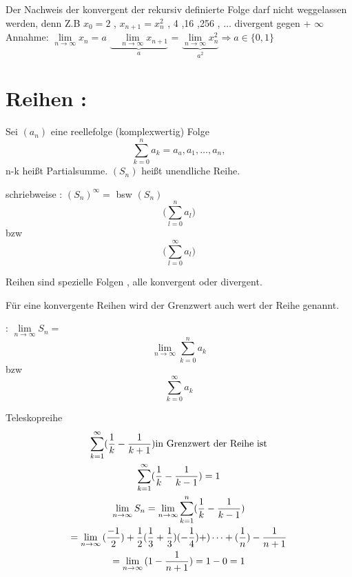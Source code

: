 \begin{remark}
Der Nachweis der konvergent der rekursiv definierte Folge darf nicht weggelassen werden, denn Z.B $x_0=2$ , $x_{n+1}=x_n^2$ \quad \quad {} , 4 ,16 ,256 , $\dots $ divergent gegen + $\infty$  \\

Annahme: $\lim\limits_{n \rightarrow \infty}{x_n}= a $ 
$\underbrace{\quad \lim\limits_{n \rightarrow \infty}{x_{n+1}}}_{a}$ = 
$\underbrace{\lim\limits_{n \rightarrow \infty}{x_n^2}}_{a^2} \Rightarrow a \in \{ 0,1 \}$
\end{remark}  

 
\newpage
\section{Reihen :}
\begin{definition}
Sei $(a_n)$ eine reellefolge (komplexwertig) Folge\\
$$\sum_{k = 0}^{n} {a_k} = a_a , a_1, \dots , a_n , $$
 n-k heißt Partialsumme.
$(S_n)$ heißt unendliche Reihe.

schriebweise : $(S_n)^\infty =$ bsw 
$(S_n)$ $$ \bigg( \sum_{l=0}^{n} {a_l} \bigg)$$ bzw
 $$ \bigg( \sum_{l=0}^{\infty} {a_l} \bigg)$$  
\end{definition}

\begin{remark}
Reihen sind spezielle Folgen , alle konvergent oder divergent. 
\end{remark}

\begin{definition}
Für eine konvergente Reihen wird der Grenzwert auch wert der Reihe genannt.\\

\begin{schreibweise}
 :  $\lim\limits_{n \rightarrow \infty}{S_n}= $
$$\lim\limits_{n \rightarrow \infty}{ \sum_{k=0}^{n} {a_k} }  $$ 
bzw 
$$ \sum_{k=0}^{\infty} {a_k}  $$
\end{schreibweise}

\end{definition}

\begin{example}{Teleskopreihe} 
\begin{gather*}
\sum_{k=1}^\infty(\frac{1}{k}-\frac{1}{k+1}) \text{in Grenzwert der Reihe ist}\\ 
\sum_{k=1}^\infty(\frac{1}{k}-\frac{1}{k-1})=1 \\
\lim_{n \to \infty}{S_n} = \lim_{n \to \infty}{\sum_{k=1}^n(\frac{1}{k}- \frac{1}{k-1}) }\\
= \lim\limits_{n \rightarrow \infty}{(\frac{-1}{2})+\frac{1}{2}(\frac{1}{3} + \frac{1}{3})(-\frac{1}{4})+) \dots +(\frac{1}{n})-\frac{1}{n+1}}\\
= \lim\limits_{n \rightarrow \infty}{(1- \frac{1}{n+1})}= 1-0 =1 
\end{gather*}
\end{example}

